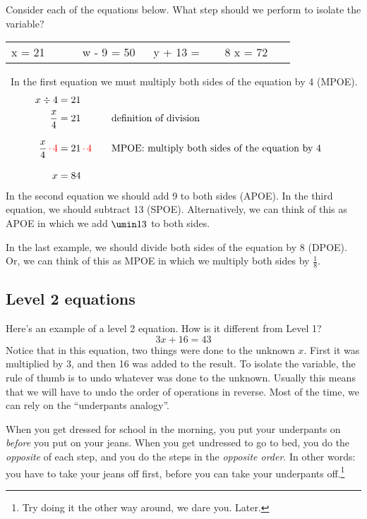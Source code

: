 \begin{boxex}
Consider each of the equations below. What step should we perform to isolate the variable?

\begin{tabular}{C{0.2\linewidth}C{0.2\linewidth}C{0.2\linewidth}C{0.2\linewidth}}
x = 21 & w - 9 = 50 & y + 13 =  & 8 x = 72\\
\end{tabular}

\expsoln\ In the first equation we must multiply both sides of the equation by 4 (MPOE).
\[\begin{aligned}
x \div 4& = 21\\
\frac{x}{4}& = 21
&&\text{\quad definition of division}\\[2ex]
\frac{x}{4} {\color{red} \,\cdot\,4} & = 21 {\color{red} \,\cdot\,4}
&&\text{\quad MPOE: multiply both sides of the equation by 4}\\[2ex]
x & = 84
\end{aligned}\]
In the second equation we should add 9 to both sides (APOE). In the third equation, we should subtract 13 (SPOE). Alternatively, we can think of this as APOE in which we add $\umin13$ to both sides.

In the last example, we should divide both sides of the equation by 8 (DPOE). Or, we can think of this as MPOE in which we multiply both sides by $\frac{1}{8}$.
\end{boxex}

\subsection{Level 2 equations}

Here's an example of a level 2 equation. How is it different from Level 1? \[3x + 16 = 43\]
Notice that in this equation, two things were done to the unknown $x$. First it was multiplied by 3, and then 16 was added to the result. To isolate the variable, the rule of thumb is to undo whatever was done to the unknown. Usually this means that we will have to undo the order of operations in reverse. Most of the time, we can rely on the ``underpants analogy''.

\begin{boxdef}
When you get dressed for school in the morning, you put your underpants on \textit{before} you put on your jeans. When you get undressed to go to bed, you do the \textit{opposite} of each step, and you do the steps in the \textit{opposite order}. In other words: you have to take your jeans off first, before you can take your underpants off.\footnote{Try doing it the other way around, we dare you. Later.}
\end{boxdef}


